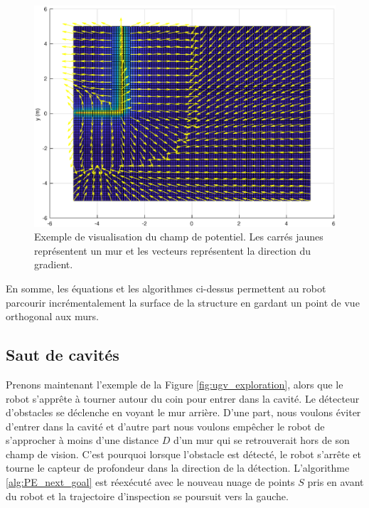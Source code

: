 \begin{figure}[ht]
  \centering
  \includegraphics[width=0.7\linewidth]{images/champ_de_potentiel.eps}
  \caption{Exemple de visualisation du champ de potentiel. Les carrés jaunes représentent un mur et les vecteurs représentent la direction du gradient. }
  \label{fig:potential_field}
\end{figure}

En somme, les équations et les algorithmes ci-dessus permettent au robot parcourir incrémentalement la surface de la structure en gardant un point de vue orthogonal aux murs.

\subsection{Saut de cavités}
\label{subsec:ugv_cavity_skip}

Prenons maintenant l'exemple de la Figure \ref{fig:ugv_exploration}, alors que le robot s'apprête à tourner autour du coin pour entrer dans la cavité. Le détecteur d'obstacles se déclenche en voyant le mur arrière. D'une part, nous voulons éviter d'entrer dans la cavité et d'autre part nous voulons empêcher le robot de s'approcher à moins d'une distance $D$ d'un mur qui se retrouverait hors de son champ de vision. C'est pourquoi lorsque l'obstacle est détecté, le robot s'arrête et tourne le capteur de profondeur dans la direction de la détection. L'algorithme \ref{alg:PE_next_goal} est réexécuté avec le nouveau nuage de points $S$ pris en avant du robot et la trajectoire d'inspection se poursuit vers la gauche.

